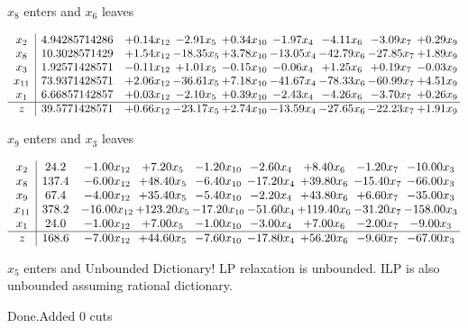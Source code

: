 \documentclass[8pt]{article}
\begin{document}
 $ x_{8} $ enters and $ x_{6} $ leaves 

 \[\begin{array}{c| c c@{\hskip 2pt} c@{\hskip 2pt} c@{\hskip 2pt} c@{\hskip 2pt} c@{\hskip 2pt} c@{\hskip 2pt} c@{\hskip 2pt} }
 x_{2}   &  4.94285714286 & +  0.14 x_{12} & -2.91 x_{5} & +  0.34 x_{10} & -1.97 x_{4} & -4.11 x_{6} & -3.09 x_{7} & +  0.29 x_{9}\\
 x_{8}   &  10.3028571429 & +  1.54 x_{12} & -18.35 x_{5} & +  3.78 x_{10} & -13.05 x_{4} & -42.79 x_{6} & -27.85 x_{7} & +  1.89 x_{9}\\
 x_{3}   &  1.92571428571 & -0.11 x_{12} & +  1.01 x_{5} & -0.15 x_{10} & -0.06 x_{4} & +  1.25 x_{6} & +  0.19 x_{7} & -0.03 x_{9}\\
 x_{11}   &  73.9371428571 & +  2.06 x_{12} & -36.61 x_{5} & +  7.18 x_{10} & -41.67 x_{4} & -78.33 x_{6} & -60.99 x_{7} & +  4.51 x_{9}\\
 x_{1}   &  6.66857142857 & +  0.03 x_{12} & -2.10 x_{5} & +  0.39 x_{10} & -2.43 x_{4} & -4.26 x_{6} & -3.70 x_{7} & +  0.26 x_{9}\\
\hline
z    &  39.5771428571 & +  0.66 x_{12} & -23.17 x_{5} & +  2.74 x_{10} & -13.59 x_{4} & -27.65 x_{6} & -22.23 x_{7} & +  1.91 x_{9}\\
\end{array}\]


 $ x_{9} $ enters and $ x_{3} $ leaves 

 \[\begin{array}{c| c c@{\hskip 2pt} c@{\hskip 2pt} c@{\hskip 2pt} c@{\hskip 2pt} c@{\hskip 2pt} c@{\hskip 2pt} c@{\hskip 2pt} }
 x_{2}   &  24.2 & -1.00 x_{12} & +  7.20 x_{5} & -1.20 x_{10} & -2.60 x_{4} & +  8.40 x_{6} & -1.20 x_{7} & -10.00 x_{3}\\
 x_{8}   &  137.4 & -6.00 x_{12} & + 48.40 x_{5} & -6.40 x_{10} & -17.20 x_{4} & + 39.80 x_{6} & -15.40 x_{7} & -66.00 x_{3}\\
 x_{9}   &  67.4 & -4.00 x_{12} & + 35.40 x_{5} & -5.40 x_{10} & -2.20 x_{4} & + 43.80 x_{6} & +  6.60 x_{7} & -35.00 x_{3}\\
 x_{11}   &  378.2 & -16.00 x_{12} & + 123.20 x_{5} & -17.20 x_{10} & -51.60 x_{4} & + 119.40 x_{6} & -31.20 x_{7} & -158.00 x_{3}\\
 x_{1}   &  24.0 & -1.00 x_{12} & +  7.00 x_{5} & -1.00 x_{10} & -3.00 x_{4} & +  7.00 x_{6} & -2.00 x_{7} & -9.00 x_{3}\\
\hline
z    &  168.6 & -7.00 x_{12} & + 44.60 x_{5} & -7.60 x_{10} & -17.80 x_{4} & + 56.20 x_{6} & -9.60 x_{7} & -67.00 x_{3}\\
\end{array}\]


 $ x_{5} $ enters and Unbounded Dictionary!
 LP relaxation is unbounded. ILP is also unbounded assuming rational dictionary. 

Done.Added 0 cuts 
\end{document}
